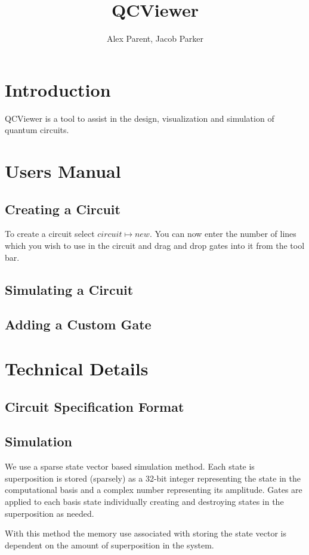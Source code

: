 \documentclass{article}
\begin{document}
\title{QCViewer}
\author{Alex Parent, Jacob Parker}
\maketitle

\section{Introduction}
QCViewer is a tool to assist in the design, visualization and simulation of quantum circuits.

\section{Users Manual}
\subsection{Creating a Circuit}
To create a circuit select $circuit\mapsto new$. You can now enter the number of lines which you wish to use in the circuit
and drag and drop gates into it from the tool bar.
\subsection{Simulating a Circuit}
\subsection{Adding a Custom Gate}

\section{Technical Details}
\subsection{Circuit Specification Format}
\subsection{Simulation}
We use a sparse state vector based simulation method.  Each state is superposition is stored (sparsely) as a 32-bit integer representing the state in the computational basis
and a complex number representing its amplitude. Gates are applied to each basis state individually creating and destroying states in the superposition as needed.

With this method the memory use associated with storing the state vector is dependent on the amount of superposition in the system.
%
%
\end{document}
